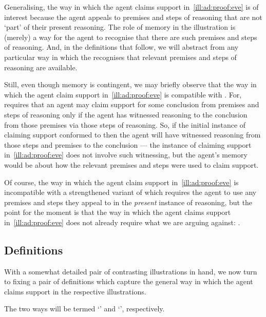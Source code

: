 \begin{note}
  Generalising, the way in which the agent claims support in~\autoref{ill:ad:proof:eve} is of interest because the agent appeals to premises and steps of reasoning that are not `part' of their present reasoning.
  The role of memory in the illustration is (merely) a way for the agent to recognise that there are such premises and steps of reasoning.
  And, in the definitions that follow, we will abstract from any particular way in which the recognises that relevant premises and steps of reasoning are available.

  Still, even though memory is contingent, we may briefly observe that the way in which the agent claim support in~\autoref{ill:ad:proof:eve} is compatible with \ESU{}.
  For, \ESU{} requires that an agent may claim support for some conclusion from premises and steps of reasoning only if the agent has witnessed reasoning to the conclusion from those premises via those steps of reasoning.
  So, if the initial instance of claiming support conformed to \ESU{} then the agent will have witnessed reasoning from those steps and premises to the conclusion --- the instance of claiming support in~\autoref{ill:ad:proof:eve} does not involve such witnessing, but the agent's memory would be about how the relevant premises and steps were used to claim support.

  Of course, the way in which the agent claim support in~\autoref{ill:ad:proof:eve} is incompatible with a strengthened variant of \ESU{} which requires the agent to use any premises and steps they appeal to in the \emph{present} instance of reasoning, but the point for the moment is that the way in which the agent claims support in~\autoref{ill:ad:proof:eve} does not already require what we are arguing against: \ESU{}.
\end{note}

\subsection{Definitions}

\begin{note}
  With a somewhat detailed pair of contrasting illustrations in hand, we now turn to fixing a pair of definitions which capture the general way in which the agent claims support in the respective illustrations.

  The two ways will be termed `\adA{}' and `\adB{}', respectively.
\end{note}


